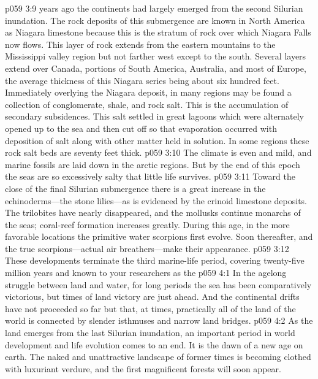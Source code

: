 \pc \vs p059 3:9  years ago the continents had largely emerged from the second Silurian inundation. The rock deposits of this submergence are known in North America as Niagara limestone because this is the stratum of rock over which Niagara Falls now flows. This layer of rock extends from the eastern mountains to the Mississippi valley region but not farther west except to the south. Several layers extend over Canada, portions of South America, Australia, and most of Europe, the average thickness of this Niagara series being about six hundred feet. Immediately overlying the Niagara deposit, in many regions may be found a collection of conglomerate, shale, and rock salt. This is the accumulation of secondary subsidences. This salt settled in great lagoons which were alternately opened up to the sea and then cut off so that evaporation occurred with deposition of salt along with other matter held in solution. In some regions these rock salt beds are seventy feet thick.\plusone
\vs p059 3:10 The climate is even and mild, and marine fossils are laid down in the arctic regions. But by the end of this epoch the seas are so excessively salty that little life survives.
\vs p059 3:11 Toward the close of the final Silurian submergence there is a great increase in the echinoderms---the stone lilies---as is evidenced by the crinoid limestone deposits. The trilobites have nearly disappeared, and the mollusks continue monarchs of the seas; coral\hyp{}reef formation increases greatly. During this age, in the more favorable locations the primitive water scorpions first evolve. Soon thereafter, and  the true scorpions---actual air breathers---make their appearance.
\vs p059 3:12 These developments terminate the third marine\hyp{}life period, covering twen\-ty\hyp{}five million years and known to your researchers as the 
\vs p059 4:1 In the agelong struggle between land and water, for long periods the sea has been comparatively victorious, but times of land victory are just ahead. And the continental drifts have not proceeded so far but that, at times, practically all of the land of the world is connected by slender isthmuses and narrow land bridges.
\vs p059 4:2 As the land emerges from the last Silurian inundation, an important period in world development and life evolution comes to an end. It is the dawn of a new age on earth. The naked and unattractive landscape of former times is becoming clothed with luxuriant verdure, and the first magnificent forests will soon appear.
